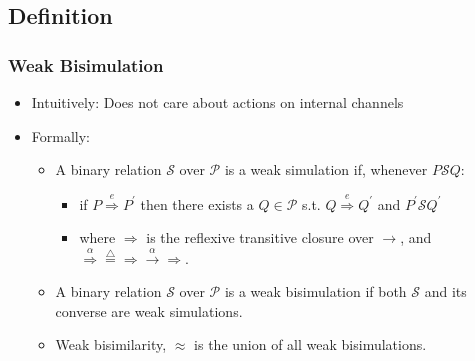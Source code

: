 \documentclass[compress]{beamer}
\begin{document}
\subsection{Definition}
\begin{frame}
\frametitle{Weak Bisimulation}
\begin{itemize}
\item Intuitively: Does not care about actions on internal channels
\pause
\item Formally:
\begin{itemize}
\item A binary relation $\mathcal{S}$ over $\mathcal{P}$ is a weak simulation if, whenever $P \mathcal{S} Q$:
\begin{itemize}
\item if $P \overset{e}{\Rightarrow} P^\prime$ then there exists a $Q \in \mathcal{P}$ s.t. $Q  \overset{e}{\Rightarrow} Q^\prime$ and $P^\prime \mathcal{S} Q^\prime$
\item where $\Rightarrow$ is the reflexive transitive closure over $\rightarrow$, and $\overset{\alpha}{\Rightarrow} \overset{\triangle}{=} \Rightarrow \overset{\alpha}{\rightarrow} \Rightarrow$.
\end{itemize}
\item A binary relation $\mathcal{S}$ over $\mathcal{P}$ is a weak bisimulation if both $\mathcal{S}$ and its converse are weak simulations.
\item Weak bisimilarity, $\approx$ is the union of all weak bisimulations.
\end{itemize}
\end{itemize}
\end{frame}
\end{document}
